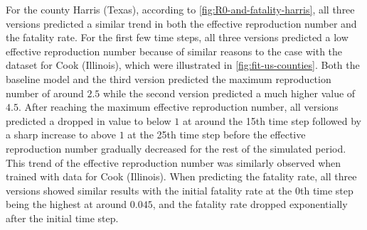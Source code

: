 For the county Harris (Texas), according to \autoref{fig:R0-and-fatality-harris}, all three versions predicted a similar trend in both the effective reproduction number and the fatality rate.
For the first few time steps, all three versions predicted a low effective reproduction number because of similar reasons to the case with the dataset for Cook (Illinois), which were illustrated in \autoref{fig:fit-us-counties}.
Both the baseline model and the third version predicted the maximum reproduction number of around $2.5$ while the second version predicted a much higher value of $4.5$.
After reaching the maximum effective reproduction number, all versions predicted a dropped in value to below $1$ at around the 15th time step followed by a sharp increase to above $1$ at the 25th time step before the effective reproduction number gradually decreased for the rest of the simulated period.
This trend of the effective reproduction number was similarly observed when trained with data for Cook (Illinois).
When predicting the fatality rate, all three versions showed similar results with the initial fatality rate at the 0th time step being the highest at around $0.045$, and the fatality rate dropped exponentially after the initial time step.

